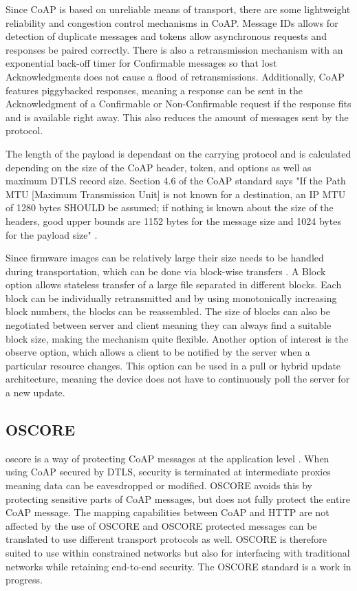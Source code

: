 \documentclass[0-thesis.tex]{subfiles}
\begin{document}
Since CoAP is based on unreliable means of transport, there are some lightweight
reliability and congestion control mechanisms in CoAP. Message IDs allows for detection of
duplicate messages and tokens allow asynchronous requests and responses be paired
correctly. There is also a retransmission mechanism with an exponential back-off timer for
Confirmable messages so that lost Acknowledgments does not cause a flood of
retransmissions. Additionally, CoAP features piggybacked responses, meaning a response can
be sent in the Acknowledgment of a Confirmable or Non-Confirmable request if the response
fits and is available right away. This also reduces the amount of messages sent by the
protocol.

The length of the payload is dependant on the carrying protocol and is calculated
depending on the size of the CoAP header, token, and options as well as maximum DTLS
record size. Section 4.6 of the CoAP standard says "If the Path MTU [Maximum Transmission
Unit] is not known for a destination, an IP MTU of 1280 bytes SHOULD be assumed; if
nothing is known about the size of the headers, good upper bounds are 1152 bytes for the
message size and 1024 bytes for the payload size" \parencite{rfc7252}.

Since firmware images can be relatively large their size needs to be handled during
transportation, which can be done via block-wise transfers \parencite{rfc7959}. A Block
option allows stateless transfer of a large file separated in different blocks. Each block
can be individually retransmitted and by using monotonically increasing block numbers, the
blocks can be reassembled. The size of blocks can also be negotiated between server and
client meaning they can always find a suitable block size, making the mechanism quite
flexible. Another option of interest is the observe option, which allows a client to be
notified by the server when a particular resource changes. This option can be used in a
pull or hybrid update architecture, meaning the device does not have to continuously poll
the server for a new update.

\subsection{OSCORE}
\label{ssec:oscore}
\gls{oscore} is a way of protecting CoAP messages at the application level
\parencite{oscore}. When using CoAP secured by DTLS, security is terminated at
intermediate proxies meaning data can be eavesdropped or modified. OSCORE avoids this by
protecting sensitive parts of CoAP messages, but does not fully protect the entire CoAP
message. The mapping capabilities between CoAP and HTTP are not affected by the use of
OSCORE and OSCORE protected messages can be translated to use different transport
protocols as well. OSCORE is therefore suited to use within constrained networks but also
for interfacing with traditional networks while retaining end-to-end security. The OSCORE
standard is a work in progress.
\end{document}
